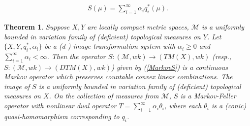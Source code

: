\documentclass[10pt,a4paper]{amsart}
\newtheorem{theorem}{Theorem}
\begin{document}
\begin{align} \label{MarkovS} 
S(\mu) = \sum_{i=1}^\infty \alpha_i q_i^* (\mu). 
\end{align}

\begin{theorem} \label{ITcontin}
Suppose $X, Y$ are locally compact metric spaces,   $\mathcal{M}$ is a uniformly bounded in variation family of (deficient) topological measures on $Y$. 
Let $\{ X, Y, q_i^*, \alpha_i \} $ be a (d-) image transformation system with  $\alpha_i \ge 0$ and $\sum_{i=1}^\infty \alpha_i < \infty$.
Then the operator $S: (\mathcal{M}, wk) \longrightarrow (TM(X), wk)$ (resp.,  $S: (\mathcal{M}, wk) \longrightarrow (DTM(X), wk)$) 
given by (\ref{MarkovS}) 
is a continuous Markov operator which preserves countable convex linear combinations. 
The image of $S$ is a uniformly bounded in variation family of (deficient) topological measures on $X$. 
On the collection of measures from $\mathcal{M}$, $S$ is a Markov-Feller operator with nonlinear
dual operator $T = \sum_{i=1}^\infty \alpha_i \theta_i$, where each $\theta_i$ is a (conic) quasi-homomorphism corresponding to $q_i$. 
\end{theorem}
\end{document}
